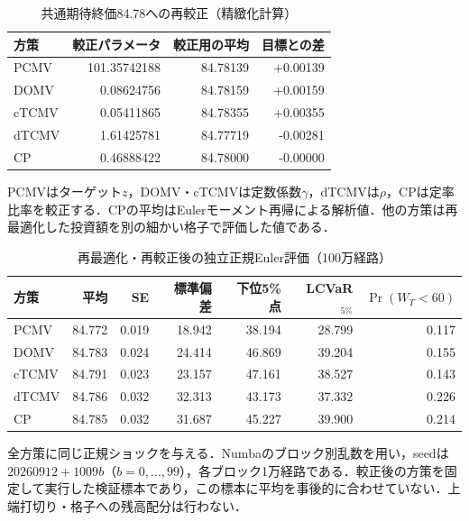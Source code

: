 \documentclass[11pt,a4paper]{article}
\numberwithin{equation}{section}
\numberwithin{table}{section}
\numberwithin{figure}{section}
\theoremstyle{plain}
\theoremstyle{definition}
\begin{document}
\begin{table}[htbp]\centering\small
\caption{共通期待終価84.78への再較正（精緻化計算）}\label{tab:recalibration}
\begin{tabular}{lrrr}\toprule 方策 & 較正パラメータ & 較正用の平均 & 目標との差 \\ \midrule
PCMV & 101.35742188 & 84.78139 & +0.00139 \\
DOMV & 0.08624756 & 84.78159 & +0.00159 \\
cTCMV & 0.05411865 & 84.78355 & +0.00355 \\
dTCMV & 1.61425781 & 84.77719 & -0.00281 \\
CP & 0.46888422 & 84.78000 & -0.00000 \\
\bottomrule\end{tabular}
\par\vspace{3pt}\begin{minipage}{.96\textwidth}\footnotesize PCMVはターゲット$z$，DOMV・cTCMVは定数係数$\gamma$，dTCMVは$\rho$，CPは定率比率を較正する．CPの平均はEulerモーメント再帰による解析値．他の方策は再最適化した投資額を別の細かい格子で評価した値である．\end{minipage}\end{table}
\begin{table}[htbp]\centering\small
\caption{再最適化・再較正後の独立正規Euler評価（100万経路）}\label{tab:equalmeanmc}
\begin{tabular}{lrrrrrr}\toprule 方策 & 平均 & SE & 標準偏差 & 下位5\%点 & LCVaR$_{5\%}$ & $\Pr(W_T<60)$ \\ \midrule
PCMV & 84.772 & 0.019 & 18.942 & 38.194 & 28.799 & 0.117 \\
DOMV & 84.783 & 0.024 & 24.414 & 46.869 & 39.204 & 0.155 \\
cTCMV & 84.791 & 0.023 & 23.157 & 47.161 & 38.527 & 0.143 \\
dTCMV & 84.786 & 0.032 & 32.313 & 43.173 & 37.332 & 0.226 \\
CP & 84.785 & 0.032 & 31.687 & 45.227 & 39.900 & 0.214 \\
\bottomrule\end{tabular}
\par\vspace{3pt}\begin{minipage}{.96\textwidth}\footnotesize 全方策に同じ正規ショックを与える．Numbaのブロック別乱数を用い，seedは$20260912+1009b$（$b=0,\ldots,99$），各ブロック1万経路である．較正後の方策を固定して実行した検証標本であり，この標本に平均を事後的に合わせていない．上端打切り・格子への残高配分は行わない．\end{minipage}\end{table}
\end{document}
